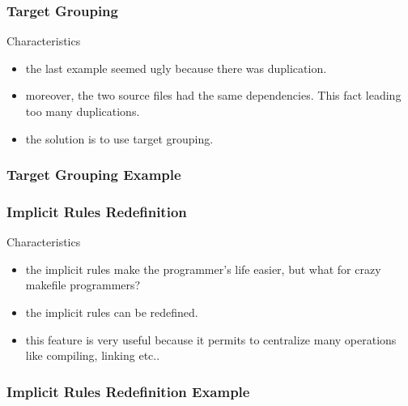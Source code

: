 \documentclass{beamer}
\begin{document}
\begin{frame}
  \frametitle{Target Grouping}

  \begin{block}{Characteristics}
    \begin{itemize}
      \item
        the last example seemed ugly because there was duplication.
      \item
        moreover, the two source files had the same dependencies. This
        fact leading too many duplications.
      \item
        the solution is to use target grouping.
    \end{itemize}
  \end{block}

\end{frame}


\begin{frame}
  \frametitle{Target Grouping Example}

  \begin{Example}
    
  \end{Example}

\end{frame}


\begin{frame}
  \frametitle{Implicit Rules Redefinition}

  \begin{block}{Characteristics}
    \begin{itemize}
      \item
        the implicit rules make the programmer's life easier, but what
        for crazy makefile programmers?
      \item
        the implicit rules can be redefined.
      \item
        this feature is very useful because it permits to centralize
        many operations like compiling, linking etc..
    \end{itemize}
  \end{block}

\end{frame}


\begin{frame}
  \frametitle{Implicit Rules Redefinition Example}

  \begin{columns}

    \column{7cm}
      \begin{Example}
        
      \end{Example}

    \column{4cm}
      \begin{Example}
        
      \end{Example}

  \end{columns}

\end{frame}
\end{document}

